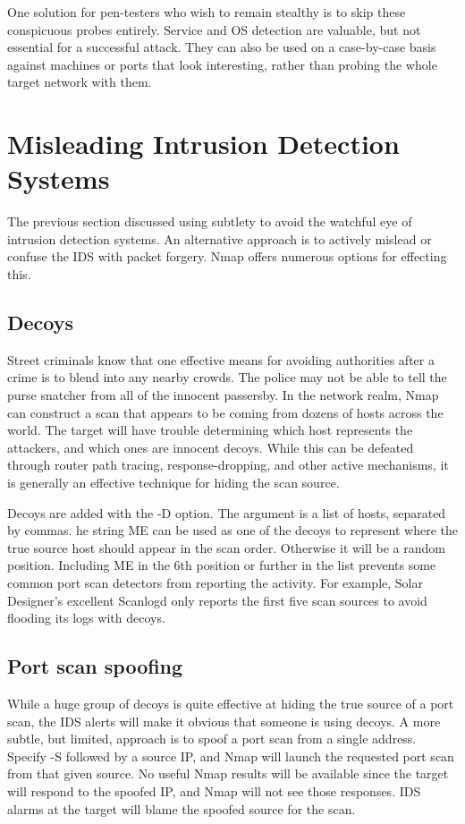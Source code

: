 One solution for pen-testers who wish to remain stealthy is to skip these conspicuous probes entirely. 
Service and OS detection are valuable, but not essential for a successful attack. 
They can also be used on a case-by-case basis against machines or ports that look interesting, rather than probing the 
whole target network with them.


\section{Misleading Intrusion Detection Systems}
The previous section discussed using subtlety to avoid the watchful eye of intrusion detection systems. 
An alternative approach is to actively mislead or confuse the IDS with packet forgery. 
Nmap offers numerous options for effecting this.

\subsection{Decoys}
Street criminals know that one effective means for avoiding authorities after a crime is to blend into any nearby crowds. 
The police may not be able to tell the purse snatcher from all of the innocent passersby. 
In the network realm, Nmap can construct a scan that appears to be coming from dozens of hosts across the world. 
The target will have trouble determining which host represents the attackers, and which ones are innocent decoys. 
While this can be defeated through router path tracing, response-dropping, and other active mechanisms, 
it is generally an effective technique for hiding the scan source.

Decoys are added with the -D option. 
The argument is a list of hosts, separated by commas. 
he string ME can be used as one of the decoys to represent where the true source host should appear in the scan order. 
Otherwise it will be a random position. Including ME in the 6th position or further in the list prevents some common 
port scan detectors from reporting the activity. 
For example, Solar Designer's excellent Scanlogd only reports the first five scan sources to avoid flooding its logs with decoys.

\subsection{Port scan spoofing}
While a huge group of decoys is quite effective at hiding the true source of a port scan, the IDS alerts will make it obvious 
that someone is using decoys. A more subtle, but limited, approach is to spoof a port scan from a single address. 
Specify -S followed by a source IP, and Nmap will launch the requested port scan from that given source. No useful 
Nmap results will be available since the target will respond to the spoofed IP, and Nmap will not see those responses. 
IDS alarms at the target will blame the spoofed source for the scan.

